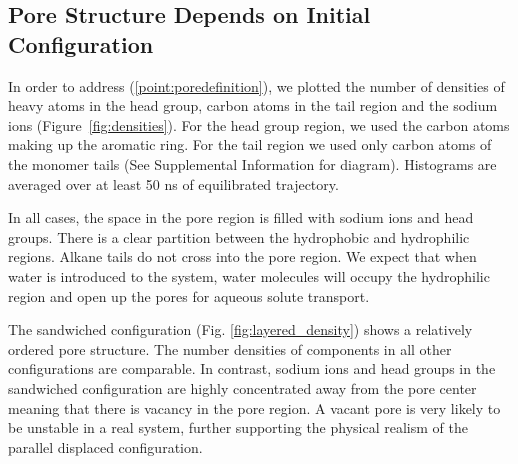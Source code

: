 \documentclass{article}
\begin{document}
  \subsection{Pore Structure Depends on Initial Configuration}

  In order to address (\ref{point:poredefinition}), we plotted the number of
  densities of heavy atoms in the head group, carbon atoms in the tail region
  and the sodium ions (Figure~\ref{fig:densities}). For the head group region,
  we used the carbon atoms making up the aromatic ring. For the tail region we
  used only carbon atoms of the monomer tails (See Supplemental Information for
  diagram). Histograms are averaged over at least 50 ns of equilibrated trajectory.

  In all cases, the space in the pore region is filled with sodium ions and
  head groups. There is a clear partition between the hydrophobic and hydrophilic
  regions. Alkane tails do not cross into the pore region. We expect that when 
  water is introduced to the system, water molecules will occupy the hydrophilic region
  and open up the pores for aqueous solute transport. 

  The sandwiched configuration (Fig. \ref{fig:layered_density}) shows a relatively
  ordered pore structure. The number densities of components in all other
  configurations are comparable. In contrast, sodium ions and head groups in the
  sandwiched configuration are highly concentrated away from the pore center
  meaning that there is vacancy in the pore region. A vacant pore is very likely
  to be unstable in a real system, further supporting the physical realism of the
  parallel displaced configuration. 
\end{document}
